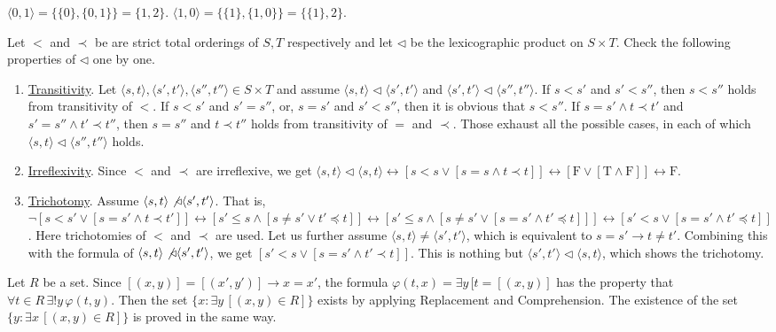 \documentclass[12pt]{article}
\theoremstyle{definition}
\newenvironment{customthm}[1]
  {\renewcommand\theinnercustomthm{#1}\innercustomthm}
  {\endinnercustomthm}
\begin{document}
\begin{customthm}{I.6.17} $\langle 0,1\rangle = \{\{0\}, \{0,1\}\} = \{1,2\}$. $\langle 1,0\rangle = \{\{1\}, \{1,0\}\} = \{\{1\}, 2\}$.
\end{customthm}

\begin{customthm}{I.7.13} Let $<$ and $\prec$ be are strict total orderings of $S,T$ respectively and let $\triangleleft$ be the lexicographic product on $S\times T$. Check the following properties of $\triangleleft$ one by one.
\begin{enumerate}
\item\underline{Transitivity}. Let $\langle s,t\rangle, \langle s',t'\rangle, \langle s'',t''\rangle \in S\times T$ and assume $\langle s,t\rangle\triangleleft\langle s',t'\rangle$ and $\langle s',t'\rangle\triangleleft\langle s'',t''\rangle$. If $s<s'$ and $s'<s''$, then $s<s''$ holds from transitivity of $<$. If $s<s'$ and $s'=s''$, or, $s=s'$ and $s'<s''$, then it is obvious that $s<s''$. If $s=s'\wedge t\prec t'$ and $s'=s''\wedge t'\prec t''$, then $s=s''$ and $t\prec t''$ holds from transitivity of $=$ and $\prec$. Those exhaust all the possible cases, in each of which $\langle s,t\rangle\triangleleft\langle s'',t''\rangle$ holds.
\item\underline{Irreflexivity}. Since $<$ and $\prec$ are irreflexive, we get $\langle s,t\rangle\triangleleft\langle s,t\rangle \leftrightarrow [s<s\vee[s=s\wedge t\prec t]] \leftrightarrow [\mathrm{F} \vee[\mathrm{T}\wedge \mathrm{F}]] \leftrightarrow \mathrm{F}$.
\item\underline{Trichotomy}. Assume $\langle s,t\rangle\not\triangleleft\langle s',t'\rangle$. That is, $\neg[s<s'\vee[s=s'\wedge t\prec t']] \leftrightarrow [s'\leq s\wedge[s\neq s'\vee t'\preccurlyeq t]] \leftrightarrow [s'\leq s\wedge[s\neq s'\vee [s=s'\wedge t'\preccurlyeq t]]] \leftrightarrow [s'<s\vee[s=s'\wedge t'\preccurlyeq t]]$. Here trichotomies of $<$ and $\prec$ are used. Let us further assume $\langle s,t\rangle\neq\langle s',t'\rangle$, which is equivalent to $s=s'\rightarrow t\neq t'$. Combining this with the formula of $\langle s,t\rangle\not\triangleleft\langle s',t'\rangle$, we get $[s'<s\vee[s=s'\wedge t'\prec t]]$. This is nothing but $\langle s',t'\rangle\triangleleft\langle s,t\rangle$, which shows the trichotomy.
\end{enumerate}
\end{customthm}

\begin{customthm}{I.7.15} Let $R$ be a set. Since  $[(x,y)]=[(x',y')]\rightarrow x=x'$, the formula $\varphi(t,x)=\exists y\,[t=[(x, y)]$ has the property that $\forall t\in R\,\exists!y\,\varphi(t,y)$. Then the set $\{x:\exists y\,[(x, y)\in R]\}$ exists by applying Replacement and Comprehension. The existence of the set $\{y:\exists x\,[(x, y)\in R]\}$ is proved in the same way.
\end{customthm}
\end{document}
